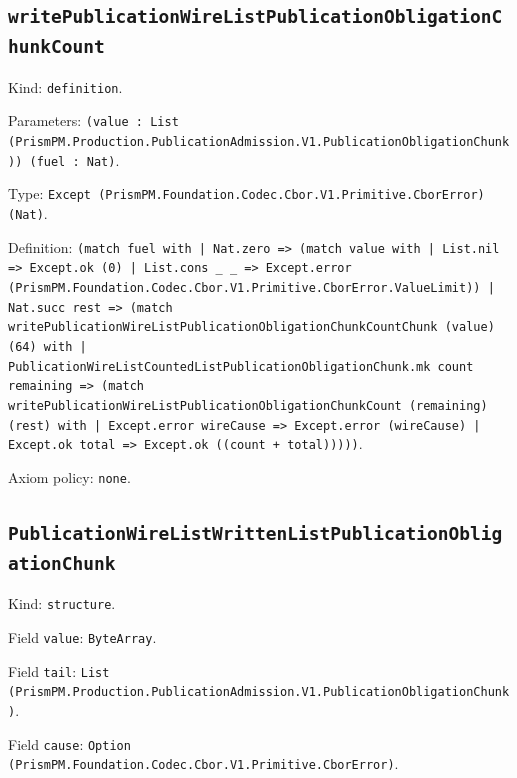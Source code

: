 \documentclass[11pt]{article}
\begin{document}
\subsection*{\texttt{writePublicationWireListPublicationObligationChunkCount}}
\noindent Kind: \texttt{definition}.\par
\noindent Parameters: \texttt{(value : List (PrismPM.Production.PublicationAdmission.V1.PublicationObligationChunk)) (fuel : Nat)}.\par
\noindent Type: \texttt{Except (PrismPM.Foundation.Codec.Cbor.V1.Primitive.CborError) (Nat)}.\par
\noindent Definition: \texttt{(match fuel with | Nat.zero => (match value with | List.nil => Except.ok (0) | List.cons \_ \_ => Except.error (PrismPM.Foundation.Codec.Cbor.V1.Primitive.CborError.ValueLimit)) | Nat.succ rest => (match writePublicationWireListPublicationObligationChunkCountChunk (value) (64) with | PublicationWireListCountedListPublicationObligationChunk.mk count remaining => (match writePublicationWireListPublicationObligationChunkCount (remaining) (rest) with | Except.error wireCause => Except.error (wireCause) | Except.ok total => Except.ok ((count + total)))))}.\par
\noindent Axiom policy: \texttt{none}.\par
\subsection*{\texttt{PublicationWireListWrittenListPublicationObligationChunk}}
\noindent Kind: \texttt{structure}.\par
\noindent Field \texttt{value}: \texttt{ByteArray}.\par
\noindent Field \texttt{tail}: \texttt{List (PrismPM.Production.PublicationAdmission.V1.PublicationObligationChunk)}.\par
\noindent Field \texttt{cause}: \texttt{Option (PrismPM.Foundation.Codec.Cbor.V1.Primitive.CborError)}.\par
\end{document}
